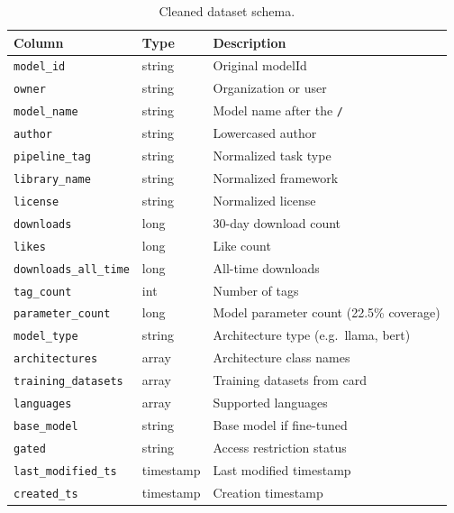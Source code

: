 \documentclass[11pt]{article}
\begin{document}
\begin{table}[H]
\centering
\small
\begin{tabular}{lll}
\toprule
\textbf{Column} & \textbf{Type} & \textbf{Description} \\
\midrule
\texttt{model\_id}          & string    & Original modelId \\
\texttt{owner}              & string    & Organization or user \\
\texttt{model\_name}        & string    & Model name after the \texttt{/} \\
\texttt{author}             & string    & Lowercased author \\
\texttt{pipeline\_tag}      & string    & Normalized task type \\
\texttt{library\_name}      & string    & Normalized framework \\
\texttt{license}            & string    & Normalized license \\
\texttt{downloads}          & long      & 30-day download count \\
\texttt{likes}              & long      & Like count \\
\texttt{downloads\_all\_time} & long    & All-time downloads \\
\texttt{tag\_count}         & int       & Number of tags \\
\texttt{parameter\_count}   & long      & Model parameter count (22.5\% coverage) \\
\texttt{model\_type}        & string    & Architecture type (e.g.\ llama, bert) \\
\texttt{architectures}      & array     & Architecture class names \\
\texttt{training\_datasets} & array     & Training datasets from card \\
\texttt{languages}          & array     & Supported languages \\
\texttt{base\_model}        & string    & Base model if fine-tuned \\
\texttt{gated}              & string    & Access restriction status \\
\texttt{last\_modified\_ts} & timestamp & Last modified timestamp \\
\texttt{created\_ts}        & timestamp & Creation timestamp \\
\bottomrule
\end{tabular}
\caption{Cleaned dataset schema.}
\end{table}
\end{document}
